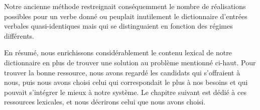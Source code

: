 Notre ancienne méthode restreignait conséquemment le nombre de réalisations possibles pour un verbe donné ou peuplait inutilement le dictionnaire d'entrées verbales quasi-identiques mais qui se distinguaient en fonction des régimes différents. 

En résumé, nous enrichissons considérablement le contenu lexical de notre dictionnaire en plus de trouver une solution au problème mentionné ci-haut. Pour trouver la bonne ressource, nous avons regardé les candidats qui s'offraient à nous, puis nous avons choisi celui qui correspondait le plus à nos besoins et qui pouvait s'intégrer le mieux à notre système. Le chapitre suivant est dédié à ces ressources lexicales, et nous décrirons celui que nous avons choisi.


